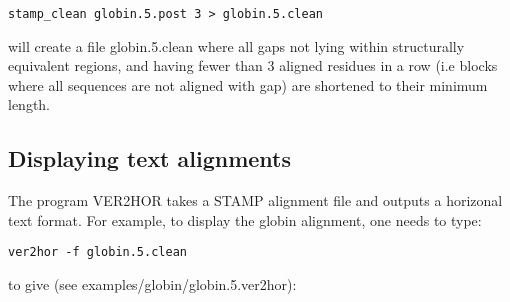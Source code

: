 \begin{scriptsize}\begin{verbatim}
stamp_clean globin.5.post 3 > globin.5.clean
\end{verbatim} \end{scriptsize}

will create a file globin.5.clean where all gaps not lying within 
structurally equivalent regions, and having fewer than 3 aligned residues 
in a row (i.e blocks where all sequences are not aligned with gap) are 
shortened to their minimum length.

\subsection{Displaying text alignments}

The program VER2HOR takes a STAMP alignment file and outputs a horizonal
text format.  For example, to display the globin alignment, one needs to
type:\\

\begin{scriptsize}\begin{verbatim}
ver2hor -f globin.5.clean 
\end{verbatim} \end{scriptsize}

to give (see examples/globin/globin.5.ver2hor):\\

